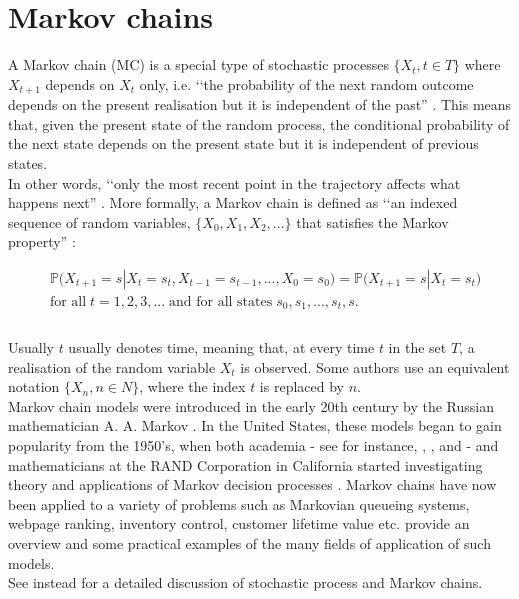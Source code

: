\documentclass[\main/main.tex]{subfiles}
\begin{document}
\section{Markov chains} \label{markov_chain}
A Markov chain (MC) is a special type of stochastic processes  $  \{ X_t, t \in T\}$ where $X_{t+1}$ depends on $X_{t}$ only, i.e. \lq\lq the probability of the next random outcome depends on the present realisation but it is independent of the past'' \citep{Grinstead1997}. 
This means that, given the present state of the random process, the conditional probability of the next state depends on the present state but it is independent of previous states.\\
In other words, \lq\lq only the most recent point in the trajectory affects what happens next'' \citep{Holmes2015}. More formally, a Markov chain is defined as \lq\lq an indexed sequence of random variables, $\{X_0, X_1, X_2, ...\}$ that satisfies the Markov property'' \citep{Sheskin2010}:

\begin{equation}
\begin{split}
     & \mathds{P} \big(X_{t+1} = s |X_t = s_t, X_{t-1} = s_{t-1}, . . . , X_0 = s_0\big) = 
     \mathds{P} \big(X_{t+1} = s |X_t = s_t\big)\\
    & \text{for all} \; t = 1, 2, 3, ... \; \text{and for all states} \; s_0, s_1, . . . , s_t, s.\\
\end{split}
\end{equation}\\



Usually $t$ usually denotes time, meaning that, at every time $t$ in the set $T$, a realisation of the random variable $X_t$ is observed.
Some authors use an equivalent notation $\{X_n, n \in N\}$, where the index $t$ is replaced by $n$.\\


Markov chain models were introduced in the early 20th century by the Russian mathematician A. A. Markov \citep{Hayes2013}. In the United States, these models began to gain popularity from the 1950's, when both academia - see for instance, \cite{Feller1950}, \cite{Howard1960}, and \cite{Kemeny1960} - and mathematicians at the RAND Corporation in California started investigating theory and applications of Markov decision processes \citep{Sheskin2010}. Markov chains have now been applied to a variety of problems such as Markovian queueing systems, webpage ranking, inventory control, customer lifetime value etc. \cite{Ching2006} provide an overview and some practical examples of the many fields of application of such models.\\
See instead \cite{Karlin1975} for a detailed discussion of stochastic process and Markov chains. \\
\end{document}
